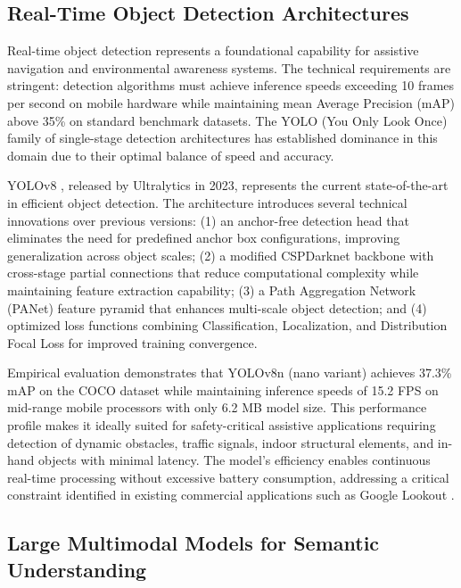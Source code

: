 \documentclass[a4paper]{report}
\begin{document}
\subsection{Real-Time Object Detection Architectures}
\label{subsec:yolo-architectures}

Real-time object detection represents a foundational capability for assistive navigation and environmental awareness systems. The technical requirements are stringent: detection algorithms must achieve inference speeds exceeding 10 frames per second on mobile hardware while maintaining mean Average Precision (mAP) above 35\% on standard benchmark datasets. The YOLO (You Only Look Once) family of single-stage detection architectures has established dominance in this domain due to their optimal balance of speed and accuracy.

YOLOv8 \cite{yolov8_ultralytics}, released by Ultralytics in 2023, represents the current state-of-the-art in efficient object detection. The architecture introduces several technical innovations over previous versions: (1) an anchor-free detection head that eliminates the need for predefined anchor box configurations, improving generalization across object scales; (2) a modified CSPDarknet backbone with cross-stage partial connections that reduce computational complexity while maintaining feature extraction capability; (3) a Path Aggregation Network (PANet) feature pyramid that enhances multi-scale object detection; and (4) optimized loss functions combining Classification, Localization, and Distribution Focal Loss for improved training convergence.

Empirical evaluation demonstrates that YOLOv8n (nano variant) achieves 37.3\% mAP on the COCO dataset \cite{lin2014coco} while maintaining inference speeds of 15.2 FPS on mid-range mobile processors with only 6.2 MB model size. This performance profile makes it ideally suited for safety-critical assistive applications requiring detection of dynamic obstacles, traffic signals, indoor structural elements, and in-hand objects with minimal latency. The model's efficiency enables continuous real-time processing without excessive battery consumption, addressing a critical constraint identified in existing commercial applications such as Google Lookout \cite{google_lookout}.

\subsection{Large Multimodal Models for Semantic Understanding}
\label{subsec:lmms}
\end{document}
